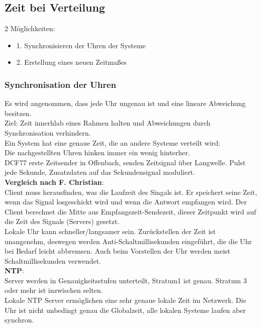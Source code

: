 \documentclass[a4paper]{article}
\begin{document}
\subsection{Zeit bei Verteilung}
2 Möglichkeiten:
\begin{itemize}
\item 1. Synchronisieren der Uhren der Systeme
\item 2. Erstellung eines neuen Zeitmaßes
\end{itemize}
\subsubsection{Synchronisation der Uhren}
Es wird angenommen, dass jede Uhr ungenau ist und eine lineare Abweichung besitzen.\\
Ziel: Zeit innerhlab eines Rahmen halten und Abweichungen durch Synchronisation verhindern.\\
Ein System hat eine genaue Zeit, die an andere Systeme verteilt wird:\\
Die nachgestellten Uhren hinken immer ein wenig hinterher. \\
DCF77 erste Zeitsender in Offenbach, senden Zeitsignal über Langwelle. Pulst jede Sekunde, Zusatzdaten auf das Sekundensignal moduliert.\\
\textbf{Vergleich nach F. Christian}:\\
Client muss herausfinden, was die Laufzeit des Singals ist. Er speichert seine Zeit, wenn das Signal losgeschickt wird und wenn die Antwort empfangen wird. Der Client berechnet die Mitte aus Empfangszeit-Sendezeit, dieser Zeitpunkt wird auf die Zeit des Signals (Servers) gesetzt.\\
Lokale Uhr kann schneller/langsamer sein. Zurückstellen der Zeit ist unangenehm, deswegen werden Anti-Schaltmillisekunden eingeführt, die die Uhr bei Bedarf leicht abbremsen. Auch beim Vorstellen der Uhr werden meist Schaltmillisekunden verwendet.\\
\textbf{NTP}:\\
Server werden in Genauigkeitsstufen unterteilt, Stratum1 ist genau. Stratum 3 oder mehr ist inzwischen selten.\\
Lokale NTP Server ermöglichen eine sehr genaue lokale Zeit im Netzwerk. Die Uhr ist nicht unbedingt genau die Globalzeit, alle lokalen Systeme laufen aber synchron.\\
\end{document}
